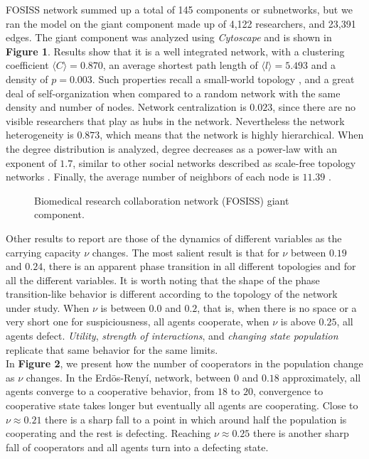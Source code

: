 \documentclass{bmcart}
\def\texttt{[image: ]}
\begin{document}
FOSISS network summed up a total of 145 components or subnetworks, but
we ran the model on the giant component made up of 4,122 researchers,
and 23,391 edges.  The giant component was analyzed using
\textit{Cytoscape} and is shown in \textbf{Figure 1}. Results show
that it is a well integrated network, with a clustering coefficient
$\langle C \rangle = 0.870$, an average shortest path length of
$\langle l \rangle = 5.493$ and a density of $p = 0.003$. Such
properties recall a small-world topology \cite{WattsStrogatz:98}, and
a great deal of self-organization when compared to a random network
with the same density and number of nodes. Network centralization is
$0.023$, since there are no visible researchers that play as hubs in
the network. Nevertheless the network heterogeneity is $0.873$, which
means that the network is highly hierarchical. When the degree
distribution is analyzed, degree decreases as a power-law with an
exponent of $1.7$, similar to other social networks described as
scale-free topology networks \cite{BarabasiAlbert:99}. Finally, the
average number
of neighbors of each node is $11.39$ \cite{Shannon:2003}.\\


\begin{figure} [h!]
\centering
\caption{Biomedical research collaboration network (FOSISS) giant component.}\label{Fosiss_GC}
\end{figure}


Other results to report are those of the dynamics of different
variables as the carrying capacity $\nu$ changes. The  most salient
result is that for $\nu$ between $0.19$ and $0.24$, there is an
apparent phase transition in all different topologies and for all the
different variables. It is worth noting that the shape
of the phase transition-like behavior is different according to the topology of the
network under study. When $\nu$ is between $0.0$ and $0.2$, that is, when there is
no space or a very short one for suspiciousness, all agents cooperate, when
$\nu$ is above $0.25$, all agents defect. \textit{Utility},
\textit{strength of interactions}, and \textit{changing state population}
replicate that same behavior for the same limits. \\ 

In \textbf{Figure 2}, we present how the number of cooperators in the population
change as $\nu$ changes. In the Erd\"{o}s-Reny\'i, network, between $0$ and
$0.18$ approximately, all agents converge to a cooperative behavior, from $18$
to $20$, convergence to cooperative state takes longer but eventually all agents
are cooperating. Close to $\nu \approx 0.21$ there is a sharp fall to a point in
which around half the population is cooperating and the rest is
defecting. Reaching $\nu \approx 0.25$ there is another sharp fall of
cooperators and all agents turn into a defecting state.\\
\end{document}
